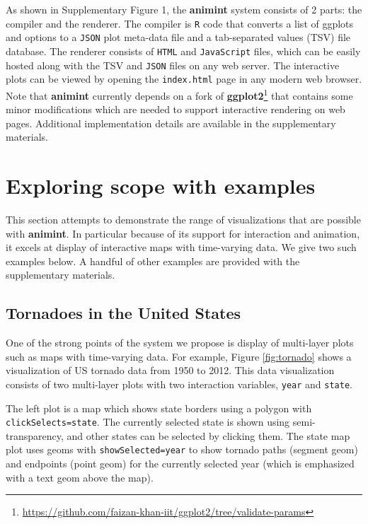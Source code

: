 \documentclass[12pt,]{article}
\let\rmarkdownfootnote\footnote%
\def\footnote{\protect\rmarkdownfootnote}
\theoremstyle{definition}
\theoremstyle{definition}
\theoremstyle{definition}
\theoremstyle{remark}
\begin{document}
As shown in Supplementary Figure 1, the \textbf{animint} system consists
of 2 parts: the compiler and the renderer. The compiler is \texttt{R}
code that converts a list of ggplots and options to a \texttt{JSON} plot
meta-data file and a tab-separated values (TSV) file database. The
renderer consists of \texttt{HTML} and \texttt{JavaScript} files, which
can be easily hosted along with the TSV and \texttt{JSON} files on any
web server. The interactive plots can be viewed by opening the
\texttt{index.html} page in any modern web browser. Note that
\textbf{animint} currently depends on a fork of
\textbf{ggplot2}\footnote{\url{https://github.com/faizan-khan-iit/ggplot2/tree/validate-params}}
that contains some minor modifications which are needed to support
interactive rendering on web pages. Additional implementation details
are available in the supplementary materials.

\hypertarget{performance}{%
\section{Exploring scope with examples}\label{performance}}

This section attempts to demonstrate the range of visualizations that
are possible with \textbf{animint}. In particular because of its support
for interaction and animation, it excels at display of interactive maps
with time-varying data. We give two such examples below. A handful of
other examples are provided with the supplementary materials.

\hypertarget{tornadoes-in-the-united-states}{%
\subsection{Tornadoes in the United
States}\label{tornadoes-in-the-united-states}}

One of the strong points of the system we propose is display of
multi-layer plots such as maps with time-varying data. For example,
Figure \ref{fig:tornado} shows a visualization of US tornado data from
1950 to 2012. This data visualization consists of two multi-layer plots
with two interaction variables, \texttt{year} and \texttt{state}.

The left plot is a map which shows state borders using a polygon with
\texttt{clickSelects=state}. The currently selected state is shown using
semi-transparency, and other states can be selected by clicking them.
The state map plot uses geoms with \texttt{showSelected=year} to show
tornado paths (segment geom) and endpoints (point geom) for the
currently selected year (which is emphasized with a text geom above the
map).
\end{document}
